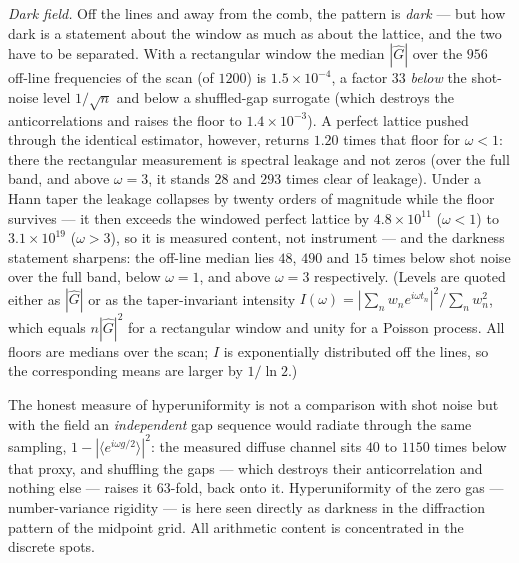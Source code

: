 \documentclass[12pt]{amsart}
\begin{document}
\emph{Dark field.} Off the lines and away from the comb, the pattern is
\emph{dark} --- but how dark is a statement about the window as much as
about the lattice, and the two have to be separated. With a rectangular
window the median $|\hat G|$ over the $956$ off-line frequencies of the
scan (of $1200$) is $1.5\times10^{-4}$, a factor $33$ \emph{below} the
shot-noise level $1/\sqrt{n}$ and below a shuffled-gap surrogate (which
destroys the anticorrelations and raises the floor to
$1.4\times10^{-3}$). A perfect lattice pushed through the identical
estimator, however, returns $1.20$ times that floor for $\omega < 1$:
there the rectangular measurement is spectral leakage and not zeros
(over the full band, and above $\omega = 3$, it stands $28$ and $293$
times clear of leakage). Under a Hann taper the leakage collapses by
twenty orders of magnitude while the floor survives --- it then exceeds
the windowed perfect lattice by $4.8\times10^{11}$ ($\omega < 1$) to
$3.1\times10^{19}$ ($\omega > 3$), so it is measured content, not
instrument --- and the darkness statement sharpens: the off-line median
lies $48$, $490$ and $15$ times below shot noise over the full band,
below $\omega = 1$, and above $\omega = 3$ respectively. (Levels are
quoted either as $|\hat G|$ or as the taper-invariant intensity
$I(\omega) = |\sum_n w_n e^{i\omega t_n}|^2 / \sum_n w_n^2$, which
equals $n|\hat G|^2$ for a rectangular window and unity for a Poisson
process. All floors are medians over the scan; $I$ is exponentially
distributed off the lines, so the corresponding means are larger by
$1/\ln 2$.)

The honest measure of hyperuniformity is not a comparison with shot
noise but with the field an \emph{independent} gap sequence would
radiate through the same sampling, $1 - |\langle e^{i\omega
g/2}\rangle|^2$: the measured diffuse channel sits $40$ to $1150$ times
below that proxy, and shuffling the gaps --- which destroys their
anticorrelation and nothing else --- raises it $63$-fold, back onto it.
Hyperuniformity of the zero gas --- number-variance rigidity --- is
here seen directly as darkness in the diffraction pattern of the
midpoint grid. All arithmetic content is concentrated in the discrete
spots.
\end{document}
